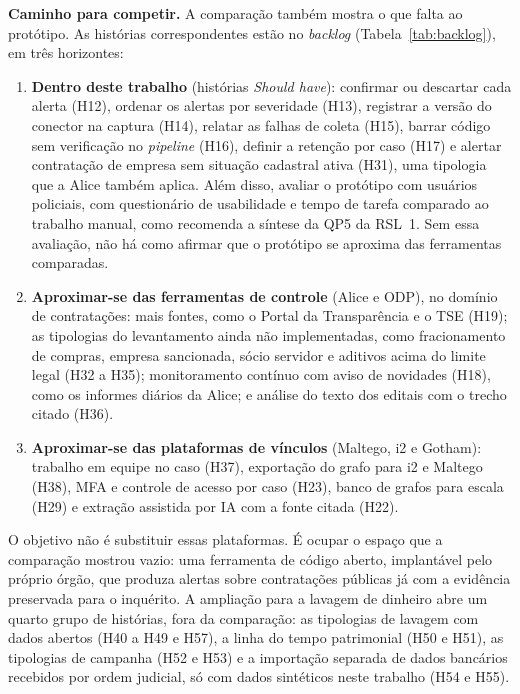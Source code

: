 \textbf{Caminho para competir.} A comparação também mostra o que falta ao
protótipo. As histórias correspondentes estão no \textit{backlog}
(Tabela~\ref{tab:backlog}), em três horizontes:
\begin{enumerate}
	\item \textbf{Dentro deste trabalho} (histórias \textit{Should have}):
	confirmar ou descartar cada alerta (H12), ordenar os alertas por
	severidade (H13), registrar a versão do conector na captura (H14), relatar
	as falhas de coleta (H15), barrar código sem verificação no
	\textit{pipeline} (H16), definir a retenção por caso (H17) e alertar
	contratação de empresa sem situação cadastral ativa (H31), uma tipologia
	que a Alice também aplica. Além disso, avaliar o protótipo com usuários
	policiais, com questionário de usabilidade e tempo de tarefa comparado ao
	trabalho manual, como recomenda a síntese da QP5 da RSL~1. Sem essa
	avaliação, não há como afirmar que o protótipo se aproxima das
	ferramentas comparadas.
	\item \textbf{Aproximar-se das ferramentas de controle} (Alice e ODP), no
	domínio de contratações: mais fontes, como o Portal da Transparência e o
	TSE (H19); as tipologias do levantamento ainda não implementadas, como
	fracionamento de compras, empresa sancionada, sócio servidor e aditivos
	acima do limite legal (H32 a H35); monitoramento contínuo com aviso de
	novidades (H18), como os informes diários da Alice; e análise do texto
	dos editais com o trecho citado (H36).
	\item \textbf{Aproximar-se das plataformas de vínculos} (Maltego, i2 e
	Gotham): trabalho em equipe no caso (H37), exportação do grafo para i2 e
	Maltego (H38), MFA e controle de acesso por caso (H23), banco de grafos
	para escala (H29) e extração assistida por IA com a fonte citada (H22).
\end{enumerate}
O objetivo não é substituir essas plataformas. É ocupar o espaço que a
comparação mostrou vazio: uma ferramenta de código aberto, implantável pelo
próprio órgão, que produza alertas sobre contratações públicas já com a
evidência preservada para o inquérito.
A ampliação para a lavagem de dinheiro abre um quarto grupo de histórias,
fora da comparação: as tipologias de lavagem com dados abertos (H40 a H49 e
H57), a linha do tempo patrimonial (H50 e H51), as tipologias de campanha
(H52 e H53) e a importação separada de dados bancários recebidos por ordem
judicial, só com dados sintéticos neste trabalho (H54 e H55).

